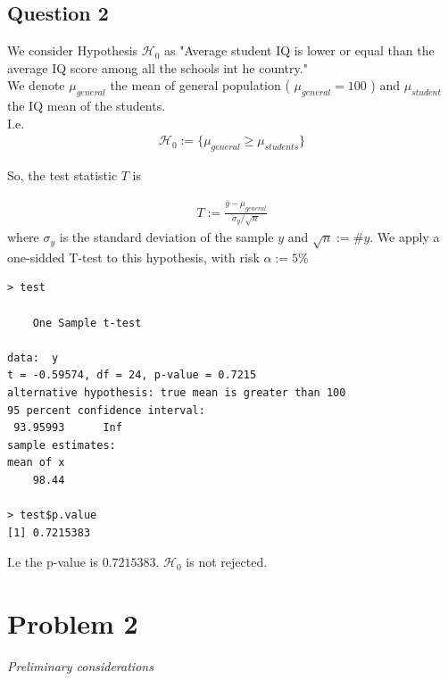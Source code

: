 \documentclass[12pt,letterpaper]{article}
\begin{document}
\vspace{.5cm}

\subsection*{Question 2}

We consider Hypothesis $ \mathcal{H}_0$ as  "Average student IQ is lower or equal than the average IQ score among all the schools int he country." \\
We denote $\mu_{general}$ the mean of general population ( $\mu_{general} = 100$ ) and $\mu_{student}$ the IQ mean of the students.\\
I.e. 
\begin{align*}
	 \mathcal{H}_0 := \{ \mu_{general} \geqslant \mu_{students} \}
\end{align*}

So, the test statistic $T$ is

\begin{align*}
	 T := \frac{\bar{y}-\mu_{general}}{\sigma_y / \sqrt{n}}
\end{align*}
where $\sigma_y$ is the standard deviation of the sample $y$ and $\sqrt{n}:= \# y $. 
\vspace{.25cm}
We apply a one-sidded T-test to this hypothesis, with risk $\alpha :=5\%$

  

\begin{verbatim}
> test

	One Sample t-test

data:  y
t = -0.59574, df = 24, p-value = 0.7215
alternative hypothesis: true mean is greater than 100
95 percent confidence interval:
 93.95993      Inf
sample estimates:
mean of x 
    98.44 

> test$p.value
[1] 0.7215383
\end{verbatim}


I.e the p-value is $0.7215383$.  $\mathcal{H}_0$ is not rejected.


\section*{Problem 2}
\textit{Preliminary considerations\\}

  
\end{document}
